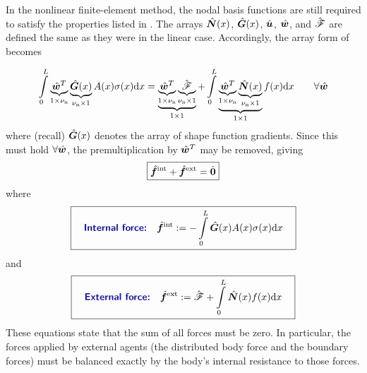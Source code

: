 In the nonlinear finite-element method, the nodal basis functions are still required to satisfy the properties listed in . The arrays $\hat{\bm{N}}(x)$, $\hat{\bm{G}}(x)$, $\hat{\bm{u}}$, $\hat{\bm{w}}$, and $\hat{\bm{\mathscr{F}}}$ are defined the same as they were in the linear case. Accordingly, the array form of  becomes

\begin{equation}
 \int\limits_0^L \underbrace{\hat{\bm{w}}^T}_{1\times{\nu_\text{n}}}\underbrace{\hat{\bm{G}}(x)}_{{\nu_\text{n}}\times1} A(x) {\sigma}(x) \mathrm{d} x 
= 
\underbrace{\underbrace{\hat{\bm{w}}^T}_{1\times{\nu_\text{n}}}\underbrace{\hat{\bm{\mathscr{F}}}}_{{\nu_\text{n}}\times1}}_{1\times1}
+  \int\limits_0^L \underbrace{\underbrace{\hat{\bm{w}}^T}_{1\times{\nu_\text{n}}}\underbrace{\hat{\bm{N}}(x)}_{{\nu_\text{n}}\times1}}_{1\times1}f(x)
\mathrm{d} x
 \qquad\forall\hat{\bm{w}}
\label{eq:nonLinearBarWeakFormWithForces}
\end{equation}
where (recall) $\hat{\bm{G}}(x)$ denotes the array of shape function gradients.
Since this must hold $\forall\hat{\bm{w}}$, the premultiplication by $\hat{\bm{w}}^T$ may be removed, giving
\begin{equation}
 \boxed{\hat{\bm{f}}^\text{int} +  \hat{\bm{f}}^\text{ext} = \hat{\bm{0}}}
\label{eq:nonLinearBarWeakFormWithForcesDiscr}
\end{equation}
%
where
\begin{equation}
\boxit{\quad
\text{\Defn{Internal force:}}\quad
  \Array{f}^\text{int}\definedEqual -\int\limits_0^L \gradNBFa(x) A(x) \sig(x) \dd x
\quad}
\label{eq:nonlinearBarInternalForce}
\end{equation}
and
\begin{equation}
\boxit{\quad
\text{\Defn{External force:}}\quad
  \Array{f}^\text{ext}
\definedEqual
\Array{\tractionForce} +  \int\limits_0^L \NBFa(x)f(x)\dd x
\quad}
\label{eq:nonlinearBarExternalForce}
\end{equation}
These equations state that the sum of all forces must be zero. In particular, the forces applied by external agents (the distributed body force and the boundary forces) must be balanced exactly by the body's internal resistance to those forces.












